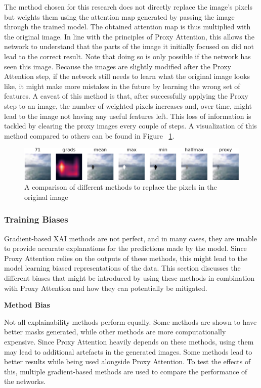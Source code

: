 The method chosen for this research does not directly replace the image's pixels but weights them using the attention map generated by passing the image through the trained model.
The obtained attention map is thus multiplied with the original image. In line with the principles of Proxy Attention, this allows the network to understand that the parts of the image it initially focused on did not lead to the correct result. Note that doing so is only possible if the network has seen this image. Because the images are slightly modified after the Proxy Attention step, if the network still needs to learn what the original image looks like, it might make more mistakes in the future by learning the wrong set of features.
A caveat of this method is that, after successfully applying the Proxy step to an image, the number of weighted pixels increases and, over time, might lead to the image not having any useful features left. This loss of information is tackled by clearing the proxy images every couple of steps.
A visualization of this method compared to others can be found in Figure ~\ref{fig:methods}.

\begin{figure}[h]
    \centering
    \includegraphics[width=1\textwidth]{images/methods-crop.pdf}
    \caption{A comparison of different methods to replace the pixels in the original image}
    \label{fig:methods}
\end{figure}

\subsubsection{Training Biases}
Gradient-based XAI methods are not perfect, and in many cases, they are unable to provide accurate explanations for the predictions made by the model. Since Proxy Attention relies on the outputs of these methods, this might lead to the model learning biased representations of the data. This section discusses the different biases that might be introduced by using these methods in combination with Proxy Attention and how they can potentially be mitigated.

\textbf{Method Bias}

Not all explainability methods perform equally. Some methods are shown to have better masks generated, while other methods are more computationally expensive. Since Proxy Attention heavily depends on these methods, using them may lead to additional artefacts in the generated images. Some methods lead to better results while being used alongside Proxy Attention. To test the effects of this, multiple gradient-based methods are used to compare the performance of the networks.

